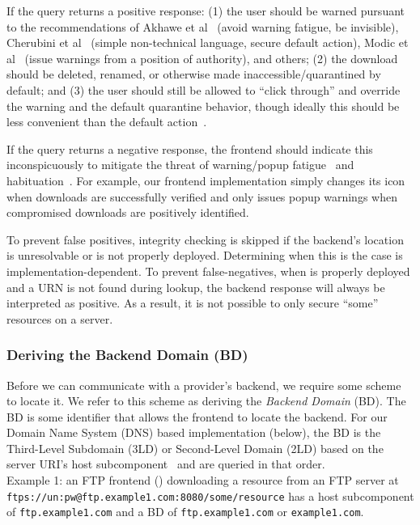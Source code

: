 If the query returns a positive response: (1) the user should be warned pursuant
to the recommendations of Akhawe et al~\cite{Akhawe} (avoid warning fatigue, be
invisible), Cherubini et al~\cite{Cherubini} (simple non-technical language,
secure default action), Modic et al~\cite{Modic} (issue warnings from a position
of authority), and others; (2) the download should be deleted, renamed, or
otherwise made inaccessible/quarantined by default; and (3) the user should
still be allowed to ``click through'' and override the warning and the default
quarantine behavior, though ideally this should be less convenient than the
default action~\cite{Cherubini}.

If the query returns a negative response, the frontend should indicate this
inconspicuously to mitigate the threat of warning/popup
fatigue~\cite{Akhawe, Cherubini} and habituation~\cite{Sunshine}. For example,
our frontend implementation simply changes its icon when downloads are
successfully verified and only issues popup warnings when compromised downloads
are positively identified.

To prevent false positives, integrity checking is skipped if the backend's
location is unresolvable or \SYSTEM{} is not properly deployed. Determining when
this is the case is implementation-dependent. To prevent false-negatives, when
\SYSTEM{} is properly deployed and a URN is not found during lookup, the backend
response will always be interpreted as positive. As a result, it is not possible
to only secure ``some'' resources on a server.

\subsubsection{Deriving the Backend Domain (BD)}

Before we can communicate with a provider's backend, we require some scheme to
locate it. We refer to this scheme as deriving the \emph{Backend Domain} (BD).
The BD is some identifier that allows the frontend to locate the backend. For
our Domain Name System (DNS) based implementation (below), the BD is the
Third-Level Subdomain (3LD) or Second-Level Domain (2LD) based on the server
URI's host subcomponent~\cite{RFC3986} and are queried in that order. \\

Example 1: an FTP frontend () downloading a
resource from an FTP server at
\texttt{ftps://un:pw@ftp.example1.com:8080/some/resource} has a host
subcomponent of \texttt{ftp.example1.com} and a BD of \texttt{ftp.example1.com}
or \texttt{example1.com}. \\

